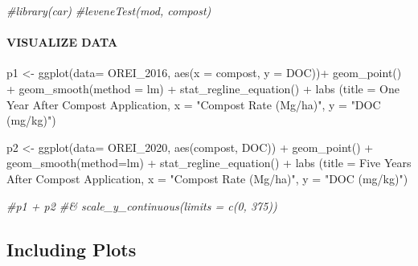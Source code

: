 \documentclass[
]{article}
\newenvironment{Shaded}{\begin{snugshade}}{\end{snugshade}}
\newcommand{\AttributeTok}[1]{\textcolor[rgb]{0.77,0.63,0.00}{#1}}
\newcommand{\CommentTok}[1]{\textcolor[rgb]{0.56,0.35,0.01}{\textit{#1}}}
\newcommand{\FunctionTok}[1]{\textcolor[rgb]{0.00,0.00,0.00}{#1}}
\newcommand{\NormalTok}[1]{#1}
\newcommand{\OtherTok}[1]{\textcolor[rgb]{0.56,0.35,0.01}{#1}}
\newcommand{\SpecialCharTok}[1]{\textcolor[rgb]{0.00,0.00,0.00}{#1}}
\newcommand{\StringTok}[1]{\textcolor[rgb]{0.31,0.60,0.02}{#1}}
\begin{document}
\begin{Shaded}
\begin{Highlighting}[]
\CommentTok{\#library(car)}
\CommentTok{\#leveneTest(mod, compost)}
\end{Highlighting}
\end{Shaded}

\hypertarget{visualize-data}{%
\paragraph{VISUALIZE DATA}\label{visualize-data}}

\begin{Shaded}
\begin{Highlighting}[]
\NormalTok{p1 }\OtherTok{\textless{}{-}} \FunctionTok{ggplot}\NormalTok{(}\AttributeTok{data=}\NormalTok{ OREI\_2016, }\FunctionTok{aes}\NormalTok{(}\AttributeTok{x =}\NormalTok{ compost, }\AttributeTok{y =}\NormalTok{ DOC))}\SpecialCharTok{+}
  \FunctionTok{geom\_point}\NormalTok{() }\SpecialCharTok{+}
  \FunctionTok{geom\_smooth}\NormalTok{(}\AttributeTok{method =} \StringTok{\textquotesingle{}lm\textquotesingle{}}\NormalTok{) }\SpecialCharTok{+}
  \FunctionTok{stat\_regline\_equation}\NormalTok{() }\SpecialCharTok{+}
  \FunctionTok{labs}\NormalTok{ (}\AttributeTok{title =} \StringTok{\textquotesingle{}One Year After Compost Application\textquotesingle{}}\NormalTok{, }\AttributeTok{x =} \StringTok{"Compost Rate (Mg/ha)"}\NormalTok{, }\AttributeTok{y =} \StringTok{"DOC (mg/kg)"}\NormalTok{)}

\NormalTok{p2 }\OtherTok{\textless{}{-}} \FunctionTok{ggplot}\NormalTok{(}\AttributeTok{data=}\NormalTok{ OREI\_2020, }\FunctionTok{aes}\NormalTok{(compost, DOC)) }\SpecialCharTok{+}
  \FunctionTok{geom\_point}\NormalTok{() }\SpecialCharTok{+}
  \FunctionTok{geom\_smooth}\NormalTok{(}\AttributeTok{method=}\StringTok{\textquotesingle{}lm\textquotesingle{}}\NormalTok{) }\SpecialCharTok{+}
  \FunctionTok{stat\_regline\_equation}\NormalTok{() }\SpecialCharTok{+}
  \FunctionTok{labs}\NormalTok{ (}\AttributeTok{title =} \StringTok{\textquotesingle{}Five Years After Compost Application\textquotesingle{}}\NormalTok{, }\AttributeTok{x =} \StringTok{"Compost Rate (Mg/ha)"}\NormalTok{, }\AttributeTok{y =} \StringTok{"DOC (mg/kg)"}\NormalTok{)}

\CommentTok{\#p1 + p2 \#\& scale\_y\_continuous(limits = c(0, 375)) }
\end{Highlighting}
\end{Shaded}

\hypertarget{including-plots}{%
\subsection{Including Plots}\label{including-plots}}
\end{document}

